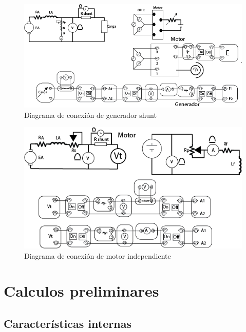 \documentclass[11pt,letterpaper]{article}     %
\begin{document}
\begin{figure}[H]
    \centering
    \includegraphics[scale=0.5]{./recursos-Lab6/diagGeneradorShunt.png}
    \caption{Diagrama de conexión de generador shunt}
    \label{fig:diagGeneradorShunt}
\end{figure}
\begin{figure}[H]
    \centering
    \includegraphics[scale=0.5]{./recursos-Lab6/diagMotorIndependient.png}
    \caption{Diagrama de conexión de motor independiente}
    \label{fig:diagMotorIndependiente}
\end{figure}
\section{Calculos preliminares}
\subsection{Características internas}
\end{document}
